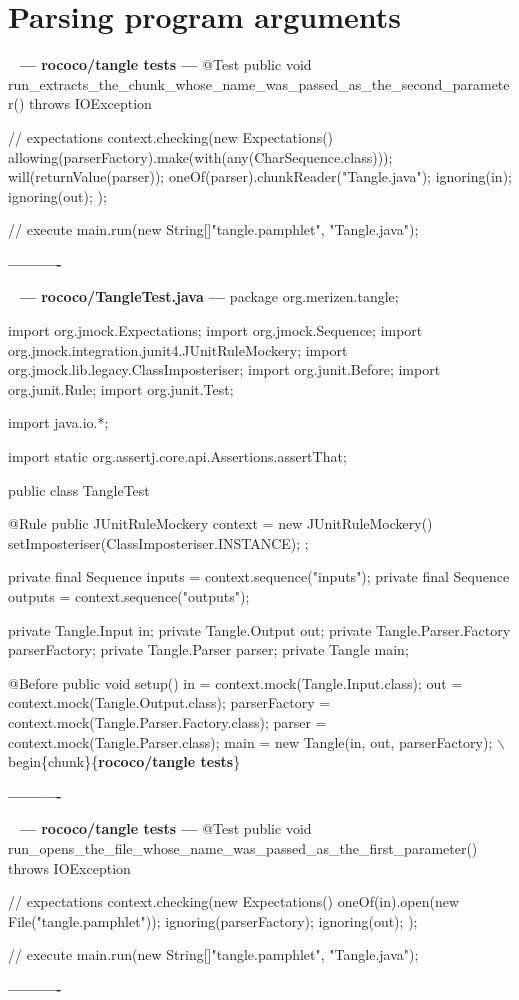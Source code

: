 \documentclass{book}
\newenvironment{chunk}[1]{%
{\ }\newline\noindent%
\hbox{\hskip 2.0cm}{\bf --- #1 ---}%
\verbatim}%                               say exactly what we see
{\endverbatim%
\par{}%
\noindent{}%
\hbox{\hskip 2.0cm}{\bf ----------}%
\par%
\normalsize\noindent}%
\providecommand{\getchunk}[1]{%
\noindent%
{\small $\backslash{}$begin\{chunk\}\{{\bf #1}\}}%
\index{{#1}}}
\begin{document}
\section{Parsing program arguments}
\begin{chunk}{rococo/tangle tests}
@Test
public void run_extracts_the_chunk_whose_name_was_passed_as_the_second_parameter() throws IOException {
    // expectations
    context.checking(new Expectations() {{
        allowing(parserFactory).make(with(any(CharSequence.class)));
        will(returnValue(parser));
        oneOf(parser).chunkReader("Tangle.java");
        ignoring(in);
        ignoring(out);
    }});

    // execute
    main.run(new String[]{"tangle.pamphlet", "Tangle.java"});
}
\end{chunk}

\begin{chunk}{rococo/TangleTest.java}
package org.merizen.tangle;

import org.jmock.Expectations;
import org.jmock.Sequence;
import org.jmock.integration.junit4.JUnitRuleMockery;
import org.jmock.lib.legacy.ClassImposteriser;
import org.junit.Before;
import org.junit.Rule;
import org.junit.Test;

import java.io.*;

import static org.assertj.core.api.Assertions.assertThat;

public class TangleTest {
    @Rule
    public JUnitRuleMockery context = new JUnitRuleMockery() {{
        setImposteriser(ClassImposteriser.INSTANCE);
    }};

    private final Sequence inputs = context.sequence("inputs");
    private final Sequence outputs = context.sequence("outputs");

    private Tangle.Input in;
    private Tangle.Output out;
    private Tangle.Parser.Factory parserFactory;
    private Tangle.Parser parser;
    private Tangle main;

    @Before
    public void setup() {
        in = context.mock(Tangle.Input.class);
        out = context.mock(Tangle.Output.class);
        parserFactory = context.mock(Tangle.Parser.Factory.class);
        parser = context.mock(Tangle.Parser.class);
        main = new Tangle(in, out, parserFactory);
    }
\getchunk{rococo/tangle tests}
}
\end{chunk}

\begin{chunk}{rococo/tangle tests}
@Test
public void run_opens_the_file_whose_name_was_passed_as_the_first_parameter() throws IOException {
    // expectations
    context.checking(new Expectations() {{
        oneOf(in).open(new File("tangle.pamphlet"));
        ignoring(parserFactory);
        ignoring(out);
    }});

    // execute
    main.run(new String[]{"tangle.pamphlet", "Tangle.java"});
}
\end{chunk}
\end{document}
